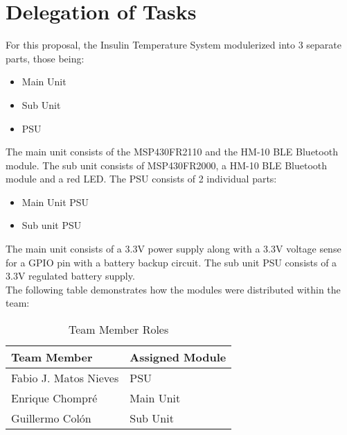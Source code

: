 \section{Delegation of Tasks}
For this proposal, the Insulin Temperature System modulerized into 3 separate parts, those being:
\begin{itemize}
  \item Main Unit
  \item Sub Unit
  \item PSU
\end{itemize}
The main unit consists of the MSP430FR2110 and the HM-10 BLE Bluetooth module. The sub unit consists of MSP430FR2000, a HM-10 BLE Bluetooth module and a red LED. The PSU consists of 2 individual parts:
\begin{itemize}
  \item Main Unit PSU
  \item Sub unit PSU
\end{itemize}
The main unit consists of a 3.3\si{\V} power supply along with a 3.3\si{\V} voltage sense for a GPIO pin with a battery backup circuit.  The sub unit PSU consists of a 3.3\si{\V} regulated battery supply.\\
The following table demonstrates how the modules were distributed within the team:
\begin{table}[h]
\begin{center}
\begin{tabularx}{\textwidth}{|X|X|}
 \hline
 Team Member & Assigned Module\\
 \hline
 Fabio J. Matos Nieves & PSU\\
 \hline
 Enrique Chompré & Main Unit\\
 \hline
 Guillermo Colón & Sub Unit\\
 \hline
\end{tabularx}
\end{center}
\caption{Team Member Roles}
\label{Task-Delegation}
\end{table}
